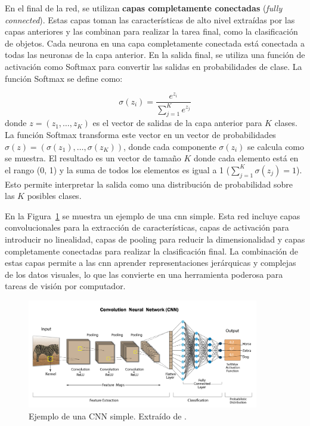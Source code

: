 \documentclass[11pt,spanish,listoffigures,listoftables]{tfgetsinf}
\begin{document}
En el final de la red, se utilizan \textbf{capas completamente conectadas} (\textit{fully connected}). Estas capas toman las características de alto nivel extraídas por las capas anteriores y las combinan para realizar la tarea final, como la clasificación de objetos. Cada neurona en una capa completamente conectada está conectada a todas las neuronas de la capa anterior. En la salida final, se utiliza una función de activación como Softmax para convertir las salidas en probabilidades de clase. La función Softmax se define como:

\begin{equation}
   \sigma(z_i) = \frac{e^{z_i}}{\sum_{j=1}^{K} e^{z_j}}
\end{equation}
donde $z = (z_1, \dots, z_K)$ es el vector de salidas de la capa anterior para $K$ clases. La función Softmax transforma este vector en un vector de probabilidades $\sigma(z) = (\sigma(z_1), \dots, \sigma(z_K))$, donde cada componente $\sigma(z_i)$ se calcula como se muestra. El resultado es un vector de tamaño $K$ donde cada elemento está en el rango (0, 1) y la suma de todos los elementos es igual a 1 ($\sum_{j=1}^{K} \sigma(z_j) = 1$). Esto permite interpretar la salida como una distribución de probabilidad sobre las $K$ posibles clases.

En la Figura~\ref{fig:cnn_example} se muestra un ejemplo de una \gls{cnn} simple. Esta red incluye capas convolucionales para la extracción de características, capas de activación para introducir no linealidad, capas de pooling para reducir la dimensionalidad y capas completamente conectadas para realizar la clasificación final. La combinación de estas capas permite a las \gls{cnn} aprender representaciones jerárquicas y complejas de los datos visuales, lo que las convierte en una herramienta poderosa para tareas de visión por computador.

\begin{figure}[H]
   \centering
   \includegraphics[width=0.9\textwidth]{images/estado_del_arte/cnn_example.png}
   \caption[Ejemplo de una CNN simple]{Ejemplo de una CNN simple. Extraído de \cite{devbreachCNN}.}
   \label{fig:cnn_example}
\end{figure}
\end{document}
